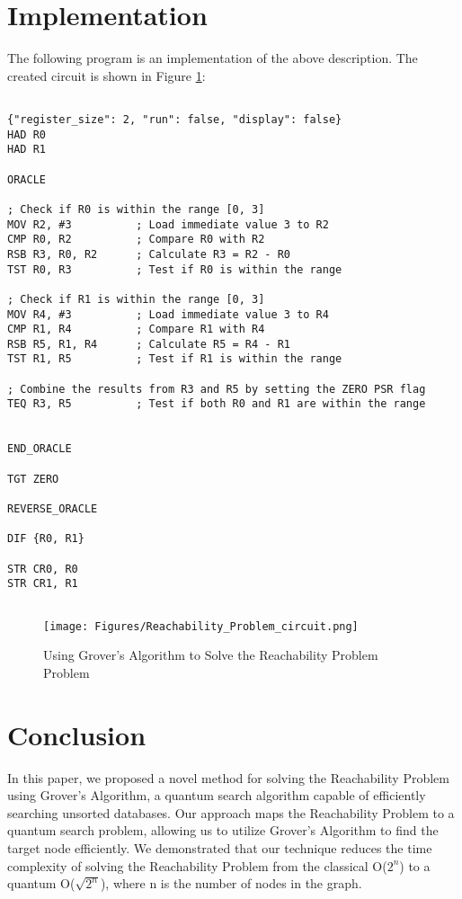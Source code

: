 \section{Implementation}

The following program is an implementation of the above description. The created circuit is shown in Figure \ref{fig:Reachability_Problem}:

\begin{lstlisting}

{"register_size": 2, "run": false, "display": false}
HAD R0
HAD R1

ORACLE

; Check if R0 is within the range [0, 3]
MOV R2, #3          ; Load immediate value 3 to R2
CMP R0, R2          ; Compare R0 with R2
RSB R3, R0, R2      ; Calculate R3 = R2 - R0
TST R0, R3          ; Test if R0 is within the range

; Check if R1 is within the range [0, 3]
MOV R4, #3          ; Load immediate value 3 to R4
CMP R1, R4          ; Compare R1 with R4
RSB R5, R1, R4      ; Calculate R5 = R4 - R1
TST R1, R5          ; Test if R1 is within the range

; Combine the results from R3 and R5 by setting the ZERO PSR flag
TEQ R3, R5          ; Test if both R0 and R1 are within the range


END_ORACLE

TGT ZERO

REVERSE_ORACLE

DIF {R0, R1}

STR CR0, R0
STR CR1, R1


\end{lstlisting}

\begin{figure}[htp]
    \centering
    \texttt{[image: Figures/Reachability\_Problem\_circuit.png]}
    \caption{Using Grover's Algorithm to Solve the Reachability Problem Problem}
    \label{fig:Reachability_Problem}
\end{figure}

\section{Conclusion}
\label{sec:conclusion}

In this paper, we proposed a novel method for solving the Reachability Problem using Grover's Algorithm, a quantum search algorithm capable of efficiently searching unsorted databases. Our approach maps the Reachability Problem to a quantum search problem, allowing us to utilize Grover's Algorithm to find the target node efficiently. We demonstrated that our technique reduces the time complexity of solving the Reachability Problem from the classical O($2^n$) to a quantum O($\sqrt{2^n}$), where n is the number of nodes in the graph.

